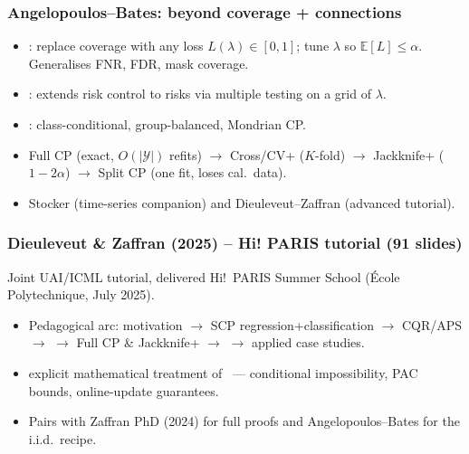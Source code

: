 \documentclass[11pt, aspectratio=169, xcolor={dvipsnames}, usepdftitle=false]{beamer}
\begin{document}
\begin{frame}
\frametitle{Angelopoulos--Bates: beyond coverage + connections}
\begin{itemize}
\item {}: replace coverage with any  loss $L(\lambda) \in [0,1]$; tune $\lambda$ so $\mathbb{E}[L] \leq \alpha$. Generalises FNR, FDR, mask coverage.
\item {}: extends risk control to  risks via multiple testing on a grid of $\lambda$.
\item {}: class-conditional, group-balanced, Mondrian CP.
\item {} Full CP (exact, $O(|\mathcal{Y}|)$ refits) $\to$ Cross/CV+ ($K$-fold) $\to$ Jackknife+ ($1{-}2\alpha$) $\to$ Split CP (one fit, loses cal.\ data).
\item {} Stocker (time-series companion) and Dieuleveut--Zaffran (advanced tutorial).
\end{itemize}
\end{frame}

\begin{frame}
\frametitle{Dieuleveut \& Zaffran (2025) -- Hi! PARIS tutorial (91 slides)}
Joint UAI/ICML tutorial, delivered Hi!~PARIS Summer School (\'Ecole Polytechnique, July 2025). 
\begin{itemize}
\item Pedagogical arc: motivation $\to$ SCP regression+classification $\to$ CQR/APS $\to$  $\to$ Full CP \& Jackknife+ $\to$  $\to$ applied case studies.
\item {} explicit mathematical treatment of ~--- conditional impossibility, PAC bounds, online-update guarantees.
\item Pairs with Zaffran PhD (2024) for full proofs and Angelopoulos--Bates for the i.i.d.\ recipe.
\end{itemize}
\end{frame}
\end{document}
